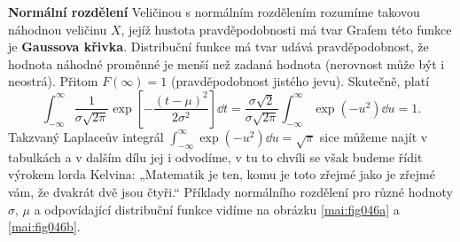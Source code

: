 \wikitextrule
\begin{example}\label{mai:exam069}
  \textbf{Normální rozdělení}\newline\small
  Veličinou s normálním rozdělením rozumíme takovou náhodnou veličinu \(X\), jejíž hustota 
  pravděpodobnosti má tvar
  Grafem této funkce je \textbf{Gaussova křivka}. Distribuční funkce má tvar
  udává pravděpodobnost, že hodnota náhodné proměnné je menší než zadaná hodnota (nerovnost může 
  být i neostrá). Přitom \(F(\infty) = 1\) (pravděpodobnost jistého jevu). Skutečně, platí
  \begin{equation*}
    \int_{-\infty}^{\infty}\dfrac{1}{\sigma\sqrt{2\pi}}
           \exp\left[-\dfrac{(t-\mu)^2}{2\sigma^2}\right]\dd{t}
    = \dfrac{\sigma\sqrt{2}}{\sigma\sqrt{2\pi}}
      \int_{-\infty}^{\infty}\exp\left(-u^2\right)\dd{u}
    =1.
  \end{equation*}
  Takzvaný Laplaceův integrál \(\int_{-\infty}^{\infty}\exp(-u^2)\dd{u} = \sqrt{\pi}\) 
  sice můžeme najít v tabulkách a v dalším dílu jej i odvodíme, v tu to chvíli se však budeme řídit 
  výrokem lorda Kelvina: „Matematik je ten, komu je toto zřejmé jako je zřejmé vám, že dvakrát dvě 
  jsou čtyři.“ Příklady normálního rozdělení pro různé hodnoty \(\sigma,\,\mu\) a odpovídající 
  distribuční funkce vidíme na obrázku \ref{mai:fig046a} a \ref{mai:fig046b}.


\end{example}

